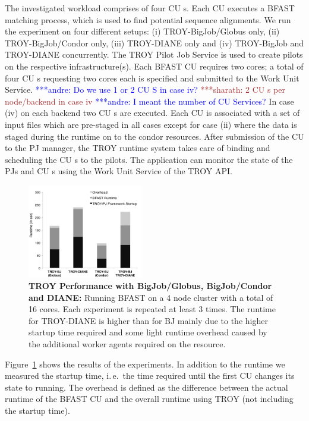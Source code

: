 \documentclass[conference,final]{IEEEtran}
\newcommand{\alnote}[1]{ {\textcolor{blue} { ***andre: #1 }}}
\newcommand{\smnote}[1]{ {\textcolor{brown} { ***sharath: #1 }}}
\newcommand{\alnote}[1]{}
\newcommand{\smnote}[1]{}
\newcommand{\cu}{CU\xspace}
\newcommand{\up}{\vspace*{-1em}}
\begin{document}
The investigated workload comprises of four \cu s. Each \cu  executes a BFAST
matching process, which is used to find potential sequence alignments. We run
the experiment on four different setups: (i) TROY-BigJob/Globus only, (ii)
TROY-BigJob/Condor only, (iii) TROY-DIANE only and (iv) TROY-BigJob and
TROY-DIANE concurrently. The TROY Pilot Job Service is used to create pilots on
the respective infrastructure(s). Each BFAST \cu  requires two cores; a total of
four \cu s requesting two cores each is specified and submitted to the Work Unit
Service. 
\alnote{Do we use 1 or 2 \cu S in case iv? }   
\smnote{2 \cu s per node/backend in case iv }\alnote{I meant the number of \cu  
Services?}
 In case (iv) on each backend two \cu s are executed. 
 Each \cu  is associated with a set of input files which are pre-staged in 
 all cases except for case (ii) where the data is staged during the runtime on
 to the condor resources. After
submission of the \cu  to the PJ manager, the TROY runtime system takes care of
binding and scheduling the \cu s to the pilots. The application can monitor the
state of the PJs and \cu s using the Work Unit Service of the TROY API.

\begin{figure}[t]
	\centering
		\includegraphics[width=0.45\textwidth]{figures/NewTROYData.pdf}
	\caption{\textbf{TROY Performance with BigJob/Globus, BigJob/Condor and 
	DIANE:} Running BFAST on a 4 node cluster with a total of 16 cores. Each 
	experiment is repeated at least 3 times. The runtime for TROY-DIANE is 
	higher than for BJ mainly due to the higher startup time required and some 
	light runtime overhead caused by the additional worker agents required on 
	the resource.\up\up}

	\label{fig:perf_perf-bfast-bj}
\end{figure}

Figure~\ref{fig:perf_perf-bfast-bj} shows the results of the experiments. In 
addition to the runtime we measured the startup time, i.\,e.\ the time required 
until the first \cu  changes its state to running. The overhead is defined as the 
difference between the actual runtime of the BFAST \cu  and the overall runtime 
using TROY (not including the startup time).
\end{document}
